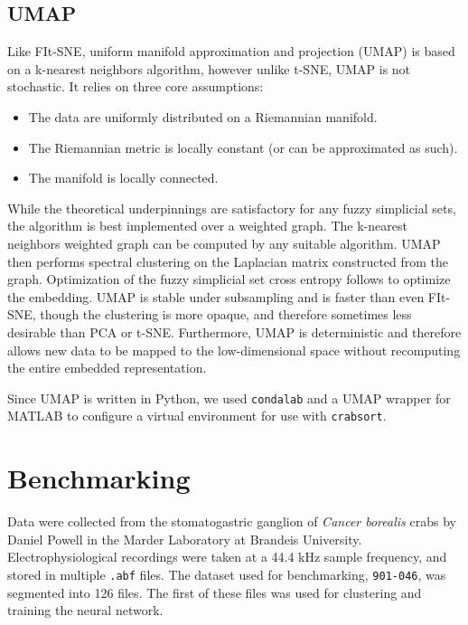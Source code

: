 \documentclass{article}
\begin{document}
\subsection{UMAP}

Like FIt-SNE, uniform manifold approximation and projection (UMAP) \autocite{mcinnesUMAPUniformManifold2018}
is based on a k-nearest neighbors algorithm, however unlike t-SNE, UMAP is not stochastic.
It relies on three core assumptions:

\begin{itemize}
  \item The data are uniformly distributed on a Riemannian manifold.
  \item The Riemannian metric is locally constant (or can be approximated as such).
  \item The manifold is locally connected.
\end{itemize}

While the theoretical underpinnings are satisfactory for any fuzzy simplicial sets,
the algorithm is best implemented over a weighted graph.
The k-nearest neighbors weighted graph can be computed by any suitable algorithm.
UMAP then performs spectral clustering on the Laplacian matrix constructed from the graph.
Optimization of the fuzzy simplicial set cross entropy follows to optimize the embedding.
UMAP is stable under subsampling and is faster than even FIt-SNE,
though the clustering is more opaque, and therefore sometimes less desirable than PCA or t-SNE.
Furthermore, UMAP is deterministic and therefore allows new data to be mapped to the low-dimensional space
without recomputing the entire embedded representation.

Since UMAP is written in Python, we used \texttt{condalab} and a UMAP wrapper for MATLAB
to configure a virtual environment for use with \texttt{crabsort}.

\section{Benchmarking}

Data were collected from the stomatogastric ganglion of \textit{Cancer borealis} crabs
by Daniel Powell in the Marder Laboratory at Brandeis University.
Electrophysiological recordings were taken at a 44.4 kHz sample frequency,
and stored in multiple \texttt{.abf} files.
The dataset used for benchmarking, \texttt{901-046}, was segmented into 126 files.
The first of these files was used for clustering and training the neural network.
\end{document}
